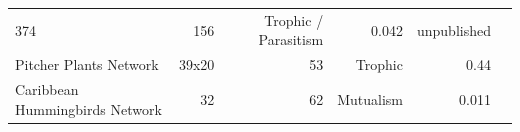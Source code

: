 \begin{landscape}
\begin{longtable}[]{@{}lrrrrr@{}}
\begin{minipage}[t]{0.08\columnwidth}
374\strut
\end{minipage} & \begin{minipage}[t]{0.09\columnwidth}\raggedleft\strut
156\strut
\end{minipage} & \begin{minipage}[t]{0.13\columnwidth}\raggedleft\strut
Trophic / Parasitism\strut
\end{minipage} & \begin{minipage}[t]{0.08\columnwidth}\raggedleft\strut
0.042\strut
\end{minipage} & \begin{minipage}[t]{0.27\columnwidth}\raggedleft\strut
unpublished\strut
\end{minipage}\tabularnewline
\begin{minipage}[t]{0.18\columnwidth}\raggedright\strut
Pitcher Plants Network\strut
\end{minipage} & \begin{minipage}[t]{0.08\columnwidth}\raggedleft\strut
39x20\strut
\end{minipage} & \begin{minipage}[t]{0.09\columnwidth}\raggedleft\strut
53\strut
\end{minipage} & \begin{minipage}[t]{0.13\columnwidth}\raggedleft\strut
Trophic\strut
\end{minipage} & \begin{minipage}[t]{0.08\columnwidth}\raggedleft\strut
0.44\strut
\end{minipage} & \begin{minipage}[t]{0.27\columnwidth}\raggedleft\strut
\citet{Baiser2012}\strut
\end{minipage}\tabularnewline
\begin{minipage}[t]{0.18\columnwidth}\raggedright\strut
Caribbean Hummingbirds Network\strut
\end{minipage} & \begin{minipage}[t]{0.08\columnwidth}\raggedleft\strut
32\strut
\end{minipage} & \begin{minipage}[t]{0.09\columnwidth}\raggedleft\strut
62\strut
\end{minipage} & \begin{minipage}[t]{0.13\columnwidth}\raggedleft\strut
Mutualism\strut
\end{minipage} & \begin{minipage}[t]{0.08\columnwidth}\raggedleft\strut
0.011\strut
\end{minipage} & \begin{minipage}[t]{0.27\columnwidth}\raggedleft\strut

\end{minipage}
\end{longtable}
\end{landscape}
